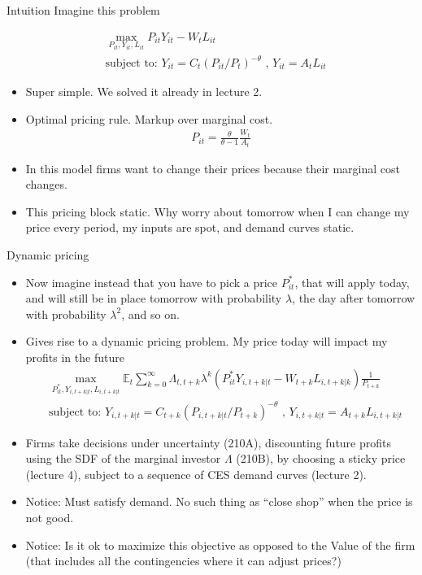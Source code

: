 \documentclass[11pt,aspectratio=169,xcolor={dvipsnames},hyperref={pdftex,pdfpagemode=UseNone,hidelinks,pdfdisplaydoctitle=true},usepdftitle=false]{beamer}
\begin{document}
\begin{frame}{Intuition}
Imagine this problem

\begin{align}
& \max_{P_{it},Y_{it}, L_{it}} P_{it} Y_{it} - W_t L_{it}\\
& \text{subject to:   } Y_{it} = C_t (P_{it}/P_t)^{-\theta} \text{  ,  } Y_{it} = A_t L_{it}
\end{align}
\begin{itemize}
\pause
\item Super simple. We solved it already in lecture 2.
\pause
\item Optimal pricing rule. Markup over marginal cost.
\begin{align*}
P_{it} = \frac{\theta}{\theta-1} \frac{W_t}{A_t}
\end{align*}
\pause
\item In this model firms want to change their prices because their marginal cost changes.
\pause
\item This pricing block static. Why worry about tomorrow when I can change my price every period, my inputs are spot, and demand curves static.
\end{itemize}
\end{frame}


\begin{frame}{Dynamic pricing}
\begin{itemize}
\item Now imagine instead that you have to pick a price $P_{it}^*$, that will apply today, and will still be in place tomorrow with probability $\lambda$, the day after tomorrow with probability $\lambda^2$, and so on.
\pause
\item Gives rise to a dynamic pricing problem. My price today will impact my profits in the future
\begin{align*}
&\max_{P^*_{it},Y_{i,t+k|t}, L_{i,t+k|t}} \mathbb{E}_t \sum_{k=0}^{\infty} \Lambda_{t,t+k} \lambda^k \left(P^*_{it} Y_{i,t+k|t} - W_{t+k} L_{i,t+k|k}\right) \frac{1}{P_{t+k}}\\
& \text{subject to:  } Y_{i,t+k|t} = C_{t+k} (P_{i,t+k|t}/P_{t+k})^{-\theta} \text{  ,  } Y_{i,t+k|t} = A_{t+k} L_{i,t+k|t}
\end{align*}
\pause
\item Firms take decisions under uncertainty (210A), discounting future profits using the SDF of the marginal investor $\Lambda$ (210B), by choosing a sticky price (lecture 4), subject to a sequence of CES demand curves (lecture 2).
\pause
\item Notice: Must satisfy demand. No such thing as ``close shop'' when the price is not good.
\pause
\item Notice: Is it ok to maximize this objective as opposed to the Value of the firm (that includes all the contingencies where it can adjust prices?)
\pause
\end{itemize}
\end{frame}
\end{document}
